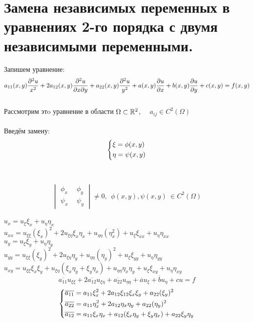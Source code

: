 \documentclass[../main.tex]{subfiles}
\begin{document}
\section{Замена независимых переменных в уравнениях 2-го порядка с двумя независимыми переменными.}
Запишем уравнение:
\begin{equation}\label{eq:1.6.1}
a_{11}(x,y)\frac{\partial^2u}{x^2} + 2a_{12}(x,y)\frac{\partial^2u}{\partial x \partial y} + a_{22}(x,y)\frac{\partial^2u}{y^2} + a(x,y)\frac{\partial u}{\partial x} +b(x,y)\frac{\partial u}{\partial y}+c(x,y) = f(x,y) \end{equation} \\
Рассмотрим этo уравнение в области $\Omega \subset \mathbb{R}^2$, \ \ $a_{ij} \in C^2(\Omega)$ \\
\\ Введём замену: 
$$\begin{dcases}\xi = \phi(x,y) \\ \eta = \psi(x,y)\end{dcases}$$
\\ \\
$$\begin{vmatrix}
\phi_x \ & \ \phi_y
\\
\psi_x \ & \ \psi_y
\end{vmatrix} \ne 0, \ \ \phi(x,y), \psi(x,y) \ \in C^2(\Omega)
$$ \\
$
    u_x = u_\xi\xi_{x}+u_\eta\eta_x 
$  \\$
    u_{xx} = u_{\xi\xi}(\xi_x)^2 + 2u_{\xi\eta}\xi_x\eta_x+u_{\eta\eta}(\eta_x^2)+u_\xi\xi_{xx}+u_\eta\eta_{xx}
$\\ $
    u_y=u_\xi\xi_y+u_\eta\eta_y
$\\
$u_{yy}=u_{\xi\xi}(\xi_y)^2+2u_{\xi\eta}\eta_y+u_{\eta\eta}(\eta_y)^2+u_\xi\xi_{yy}+u_\eta\eta_{yy}$\\
$u_{xy}=u_{\xi\xi}\xi_{x}\xi_y+u_{\xi\eta}(\xi_x\eta_y+\xi_y\eta_x)+u_{\eta\eta}\eta_x\eta_y+u_\xi\xi_{xy}+u_\eta\eta_{xy}$ \\
\begin{equation}
    \overline{a_{11}}u_{\xi\xi}+2\overline{a_{12}}u_{\xi\eta}+\overline{a_{22}}u_{\eta\eta}+\overline{a}u_{\xi}+\overline{b}u_\eta+cu=f 
\end{equation}
\begin{equation}
\begin{dcases}
\overline{a_{11}}=a_{11}\xi_x^2+2a_{12}\xi_{12}\xi_x\xi_y+a_{22}(\xi_y)^2
\\
\overline{a_{22}}=a_{11}\eta_x^2+2a_{12}\eta_x\eta_y+a_{22}(\eta_y)^2
\\
\overline{a_{12}}=a_{11}\xi_x\eta_x+a_{12}(\xi_x\eta_y+\xi_y\eta_x)+a_{22}\xi_y\eta_y
\end{dcases}
\end{equation}
\end{document}

